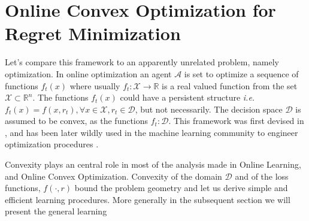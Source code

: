 \section{Online Convex Optimization for Regret Minimization}\label{sec:OCO}

Let's compare this framework to an apparently unrelated problem, namely optimization. In online optimization an agent $\mathcal A$ is set to optimize a sequence of functions $f_t(x)$ where usually $f_t:\mathcal X\to \mathbb R$ is a real valued function from the set $\mathcal X\subset\mathbb R^n$. The functions $f_t(x)$ could have a persistent structure \emph{i.e.} $f_t(x)=f(x,r_t),\forall x\in\mathcal X,r_t\in\mathcal D$, but not necessarily.
The decision space $\mathcal D$ is assumed to be convex, as the functions $f_t:\mathcal D$. This framework was first devised in \cite{zinkevich2003online}, and has been later wildly used in the machine learning community to engineer optimization procedures \cite{shalev2012online}. 

Convexity plays an central role in most of the analysis made in Online Learning, and Online Convex Optimization. Convexity of the domain $\mathcal D$ and of the loss functions, $f(\cdot,r)$ bound the problem geometry and let us derive simple and efficient learning procedures. More generally in the subsequent section we will present the general learning 

